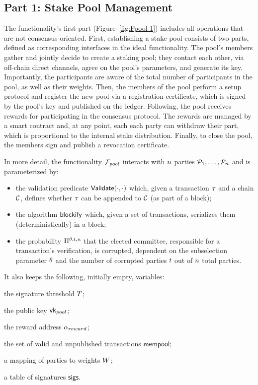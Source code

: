 \subsection{Part 1: Stake Pool Management}\label{sec:management}

The functionality's first part (Figure~\ref{fig:Fpool-1}) includes all
operations that are not consensus-oriented. First, establishing a stake pool
consists of two parts, defined as corresponding interfaces in the ideal
functionality. The pool's members gather and jointly decide to create a staking
pool; they contact each other, \eg via off-chain direct channels, agree on the
pool's parameters, and generate its key. Importantly, the participants are
aware of the total number of participants in the pool, as well as their
weights. Then, the members of the pool perform a setup protocol and register
the new pool via a registration certificate, which is signed by the pool's key
and published on the ledger. Following, the pool receives rewards for
participating in the consensus protocol. The rewards are managed by a smart
contract and, at any point, each each party can withdraw their part, which is
proportional to the internal stake distribution. Finally, to close the pool,
the members sign and publish a revocation certificate.

In more detail, the functionality ${\mathcal{F}}_{pool}$ interacts with $n$
parties $\mathcal{P}_1, \dots, \mathcal{P}_n$ and is parameterized by:
\begin{itemize}
    \item the validation predicate $\mathsf{Validate}(\cdot, \cdot)$ which, given a
        transaction $\tau$ and a chain $\mathcal{C}$, defines whether $\tau$ can be
        appended to $\mathcal{C}$ (as part of a block);
    \item the algorithm $\mathsf{blockify}$ which, given a set of transactions,
        serializes them (deterministically) in a block;
    \item the probability $\Pi^{\theta, t,
        n}$ that the elected committee, responsible for a
        transaction's verification, is corrupted, dependent on the subselection
        parameter $\theta$ and the number of corrupted parties
        $t$ out of $n$ total parties.
\end{itemize}

It also keeps the following, initially empty, variables:
\begin{inparaenum}[i)]
    \item the signature threshold $T$;
    \item the public key $\mathsf{vk}_{pool}$;
    \item the reward address $\alpha_{reward}$;
    \item the set of valid and unpublished transactions $\mathsf{mempool}$;
    \item a mapping of parties to weights $W$;
    \item a table of signatures $\mathsf{sigs}$.
\end{inparaenum}

